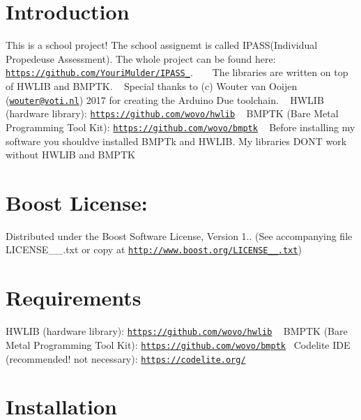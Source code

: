 \hypertarget{index_intro_sec}{}\section{Introduction}\label{index_intro_sec}
This is a school project! The school assignemt is called I\+P\+A\+S\+S(\+Individual Propedeuse Assessment). The whole project can be found here\+: \href{https://github.com/YouriMulder/IPASS_2018}{\tt https\+://github.\+com/\+Youri\+Mulder/\+I\+P\+A\+S\+S\+\_}. ~\newline
 ~\newline
 The libraries are written on top of H\+W\+L\+IB and B\+M\+P\+TK. ~\newline
 Special thanks to (c) Wouter van Ooijen (\href{mailto:wouter@voti.nl}{\tt wouter@voti.\+nl}) 2017 for creating the Arduino Due toolchain. ~\newline
 H\+W\+L\+IB (hardware library)\+: \href{https://github.com/wovo/hwlib}{\tt https\+://github.\+com/wovo/hwlib} ~\newline
 B\+M\+P\+TK (Bare Metal Programming Tool Kit)\+: \href{https://github.com/wovo/bmptk}{\tt https\+://github.\+com/wovo/bmptk} ~\newline
 Before installing my software you should\textquotesingle{}ve installed B\+M\+P\+Tk and H\+W\+L\+IB. My libraries D\+ON\textquotesingle{}T work without H\+W\+L\+IB and B\+M\+P\+TK ~\newline
 \hypertarget{index_license_sec}{}\section{Boost License\+:}\label{index_license_sec}
Distributed under the Boost Software License, Version 1.. (See accompanying file L\+I\+C\+E\+N\+S\+E\+\_\+\_.\+txt or copy at \href{http://www.boost.org/LICENSE_1_0.txt}{\tt http\+://www.\+boost.\+org/\+L\+I\+C\+E\+N\+S\+E\+\_\+\_.\+txt})\hypertarget{index_requirements_sec}{}\section{Requirements}\label{index_requirements_sec}
H\+W\+L\+IB (hardware library)\+: \href{https://github.com/wovo/hwlib}{\tt https\+://github.\+com/wovo/hwlib} ~\newline
 B\+M\+P\+TK (Bare Metal Programming Tool Kit)\+: \href{https://github.com/wovo/bmptk}{\tt https\+://github.\+com/wovo/bmptk}~\newline
 Codelite I\+DE (recommended! not necessary)\+: \href{https://codelite.org/}{\tt https\+://codelite.\+org/}\hypertarget{index_install_sec}{}\section{Installation}\label{index_install_sec}
